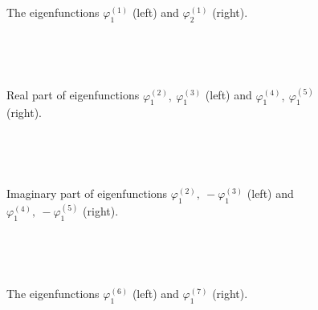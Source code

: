 \documentclass[authoryear]{elsarticle}
\begin{document}
\begin{figure}[!h]
  \begin{center}
\begin{minipage}{0.49\linewidth}
 \\
\end{minipage}
\hfill
\begin{minipage}{0.49\linewidth}
 \\
\end{minipage}
\caption{The eigenfunctions $\varphi^{(1)}_1$ (left) and $\varphi^{(1)}_2$ (right).}
\label{fig:3}
  \end{center}
\end{figure}
\begin{figure}[!h]
  \begin{center}
\begin{minipage}{0.49\linewidth}
 \\
\end{minipage}
\hfill
\begin{minipage}{0.49\linewidth}
 \\
\end{minipage}
\caption{Real part of eigenfunctions $\varphi^{(2)}_1, \ \varphi^{(3)}_1$ (left) and $\varphi^{(4)}_1, \ \varphi^{(5)}_1$ (right).}
\label{fig:4}
  \end{center}
\end{figure}
\begin{figure}[!h]
  \begin{center}
\begin{minipage}{0.49\linewidth}
 \\
\end{minipage}
\hfill
\begin{minipage}{0.49\linewidth}
 \\
\end{minipage}
\caption{Imaginary part of eigenfunctions $\varphi^{(2)}_1, \ - \varphi^{(3)}_1$ (left) and $\varphi^{(4)}_1, \ - \varphi^{(5)}_1$ (right).}
\label{fig:5}
  \end{center}
\end{figure}
\begin{figure}[!h]
  \begin{center}
\begin{minipage}{0.49\linewidth}
 \\
\end{minipage}
\hfill
\begin{minipage}{0.49\linewidth}
 \\
\end{minipage}
\caption{The eigenfunctions $\varphi^{(6)}_1$ (left) and $\varphi^{(7)}_1$ (right).}
\label{fig:6}
  \end{center}
\end{figure}
\end{document}
